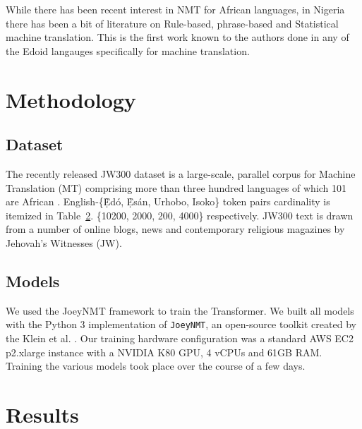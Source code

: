 \documentclass{article} %
\begin{document}
While there has been recent interest in NMT for African languages, in Nigeria there has been a bit of literature on Rule-based, phrase-based and Statistical machine translation. This is the first work known to the authors done in any of the Edoid langauges specifically for machine translation.


\section{Methodology}
\label{methods}

\subsection{Dataset}
The recently released JW300 dataset is a large-scale, parallel corpus for Machine Translation (MT) comprising more than three hundred languages of which 101 are African \citep{agic-vulic-2019-jw300}. English-\{\d{\`E}d{\'o}, \d{\`E}s{\'a}n, Urhobo, Isoko\} token pairs cardinality is itemized in Table~\ref{results}.  \{10200, 2000, 200, 4000\} respectively. JW300 text is drawn from a number of online blogs, news and contemporary religious magazines by Jehovah's Witnesses (JW).
\subsection{Models}

We used the JoeyNMT framework to train the Transformer. We built all models with the Python 3 implementation of \texttt{JoeyNMT}, an open-source toolkit created by the Klein et al. \citep{opennmt}. Our training hardware configuration was a standard AWS EC2 p2.xlarge instance with a NVIDIA K80 GPU, 4 vCPUs and 61GB RAM. Training the various models took place over the course of a few days.

\section{Results}
\label{results}
\end{document}
